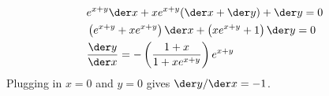 \begin{align*}
  & e^{x+y}\der x + x e^{x+y}(\der x+\der y) + \der y = 0 \\
  & \left(e^{x+y}+xe^{x+y}\right)\der x + \left(xe^{x+y}+1\right)\der y = 0 \\
  & \frac{\der y}{\der x} = -\left(\frac{1+x}{1+xe^{x+y}}\right)e^{x+y}
\end{align*}
Plugging in $x=0$ and $y=0$ gives $\der y/\der x=-1$.
